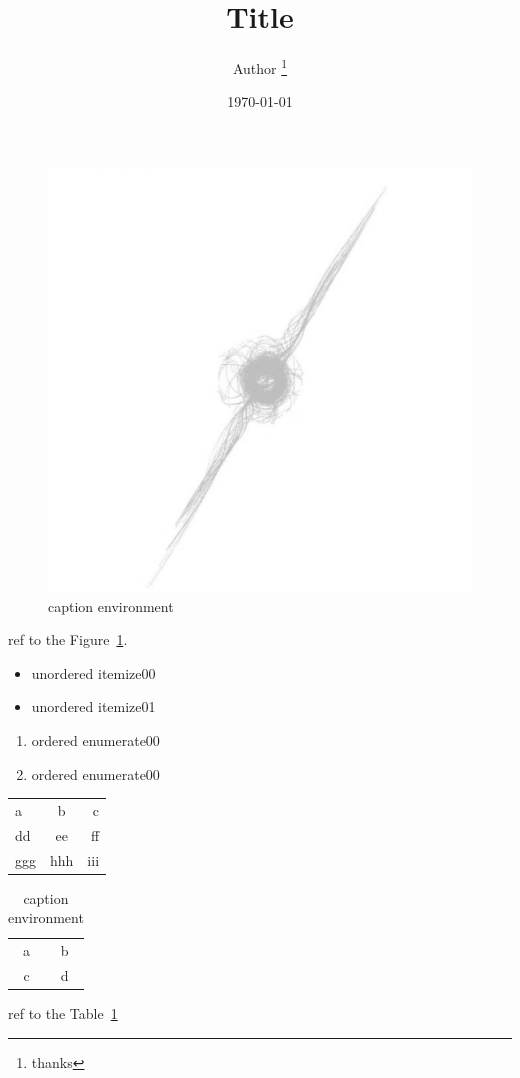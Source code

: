 \documentclass{article}
\title{Title}
\author{Author \thanks{thanks}}
\date{\today}
\begin{document}
\maketitle

\listoffigures

\listoftables

\newpage

\begin{figure}[h]
    \centering
    \includegraphics[width=\textwidth]{data/profile}
    \caption{caption environment}
    \label{fig:00} %
\end{figure}

ref to the Figure~\ref{fig:00}.

\begin{itemize}
    \item unordered itemize00
    \item unordered itemize01
\end{itemize}

\begin{enumerate}
    \item ordered enumerate00
    \item ordered enumerate00
\end{enumerate}

\begin{tabular}{||l|c|r||}
    \hline
    a & b & c\\
    dd & ee & ff\\
    ggg & hhh & iii\\
    \hline \hline
\end{tabular}

\begin{table}[h!]
    \centering
    \begin{tabular}{|c|c|}
        \hline
        a & b\\
        c & d\\
        \hline
    \end{tabular}
    \caption{caption environment}
    \label{table:00}
\end{table}

ref to the Table~\ref{table:00}
\end{document}
